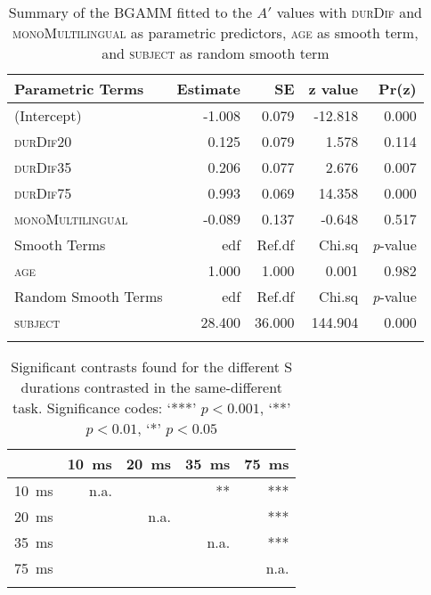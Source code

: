 \begin{table}[H]\fontsize{10}{11}
\caption{Summary of the BGAMM fitted to the $A'$ values with \textsc{durDif} and \textsc{monoMultilingual} as parametric predictors, \textsc{age} as smooth term, and \textsc{subject} as random smooth term}
\label{tab:6.11}
\centering
\begin{tabular}{lrrrr} 
\lsptoprule
Parametric Terms    & Estimate & SE     & z value & Pr(\textbar{}z\textbar{})  \\ 
\midrule
(Intercept)         & -1.008   & 0.079  & -12.818 & 0.000                      \\
\textsc{durDif20}            & 0.125    & 0.079  & 1.578   & 0.114                      \\
\textsc{durDif35}            & 0.206    & 0.077  & 2.676   & 0.007                      \\
\textsc{durDif75}            & 0.993    & 0.069  & 14.358  & 0.000                      \\
\textsc{monoMultilingual}    & -0.089   & 0.137  & -0.648  & 0.517                      \\ 
\midrule
Smooth Terms        & edf      & Ref.df & Chi.sq  & \textit{p}-value           \\ 
\midrule
\textsc{age}                 & 1.000    & 1.000  & 0.001   & 0.982                      \\ 
\midrule
Random Smooth Terms & edf      & Ref.df & Chi.sq  & \textit{p}-value           \\ 
\midrule
\textsc{subject}             & 28.400   & 36.000 & 144.904 & 0.000                      \\
\lspbottomrule
\end{tabular}
\end{table}




\begin{table}[H]\fontsize{10}{11}
\caption{Significant contrasts found for the different S durations contrasted in the same-different task. Significance codes: `***' $p < 0.001$, `**' $p < 0.01$, `*' $p < 0.05$}
\label{tab:6.12}
\centering
\begin{tabular}{lrrrr} 
\lsptoprule
\textbf{~} & 10~ms & 20~ms & 35~ms & 75~ms  \\ 
\midrule
10~ms      & n.a.  & ~     & **    & ***    \\
20~ms      & ~     & n.a.  & ~     & ***    \\
35~ms      & ~     & ~     & n.a.  & ***    \\
75~ms      & ~     & ~     & ~     & n.a.   \\
\lspbottomrule
\end{tabular}
\end{table}




